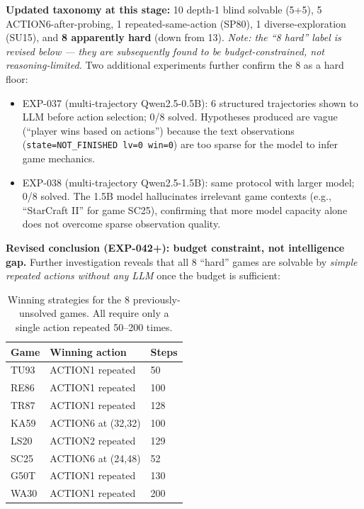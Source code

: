 \documentclass[11pt]{article}
\begin{document}
\textbf{Updated taxonomy at this stage:} 10 depth-1 blind solvable (5+5), 5 ACTION6-after-probing, 1 repeated-same-action (SP80), 1 diverse-exploration (SU15), and \textbf{8 apparently hard} (down from 13). \emph{Note: the ``8 hard'' label is revised below --- they are subsequently found to be budget-constrained, not reasoning-limited.} Two additional experiments further confirm the 8 as a hard floor:

\begin{itemize}[leftmargin=*]
\item EXP-037 (multi-trajectory Qwen2.5-0.5B): 6 structured trajectories shown to LLM before action selection; 0/8 solved. Hypotheses produced are vague (``player wins based on actions'') because the text observations (\texttt{state=NOT\_FINISHED lv=0 win=0}) are too sparse for the model to infer game mechanics.
\item EXP-038 (multi-trajectory Qwen2.5-1.5B): same protocol with larger model; 0/8 solved. The 1.5B model hallucinates irrelevant game contexts (e.g., ``StarCraft II'' for game SC25), confirming that more model capacity alone does not overcome sparse observation quality.
\end{itemize}

\textbf{Revised conclusion (EXP-042+): budget constraint, not intelligence gap.} Further investigation reveals that all 8 ``hard'' games are solvable by \emph{simple repeated actions without any LLM} once the budget is sufficient:

\begin{table}[h]
\centering
\caption{Winning strategies for the 8 previously-unsolved games. All require only a single action repeated 50--200 times.}
\label{tab:hard8}
\begin{tabular}{lll}
\toprule
Game & Winning action & Steps \\
\midrule
TU93 & ACTION1 repeated & 50 \\
RE86 & ACTION1 repeated & 100 \\
TR87 & ACTION1 repeated & 128 \\
KA59 & ACTION6 at (32,32) & 100 \\
LS20 & ACTION2 repeated & 129 \\
SC25 & ACTION6 at (24,48) & 52 \\
G50T & ACTION1 repeated & 130 \\
WA30 & ACTION1 repeated & 200 \\
\bottomrule
\end{tabular}
\end{table}
\end{document}
